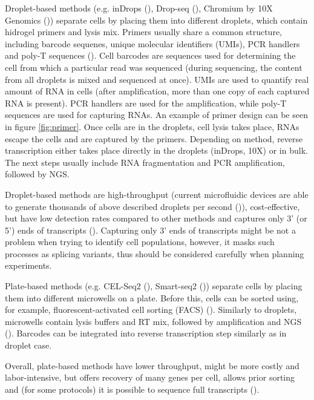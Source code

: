 Droplet-based methods (e.g. inDrops (\cite{Klein2015}), Drop-seq (\cite{Macosko2015}),
Chromium by 10X Genomics (\cite{Zheng2017}))
separate cells by placing them into different droplets, which contain hidrogel primers and lysis mix.
Primers usually share a common structure, including barcode sequenes, unique molecular identifiers (UMIs),
PCR handlers and poly-T sequences (\cite{Zhang2019}).
Cell barcodes are sequences used for determining the cell from which a particular read was sequenced
(during sequencing, the content from all droplets is mixed and sequenced at once).
UMIs are used to quantify real amount of RNA in cells
(after amplification, more than one copy of each captured RNA is present).
PCR handlers are used for the amplification, while poly-T sequences are used for capturing RNAs.
An example of primer design can be seen in figure \ref{fig:primer}.
Once cells are in the droplets, cell lysis takes place, RNAs escape the cells and are captured by the primers.
Depending on method,
reverse transcription either takes place directly in the droplets (inDrops, 10X) or in bulk.
The next steps usually include RNA fragmentation and PCR amplification, followed by NGS.

Droplet-based methods are high-throughput
(current microfluidic devices are able to generate thousands of above described droplets per second (\cite{Prakadan2017})),
cost-effective, but have low detection rates compared to other methods and
captures only 3' (or 5') ends of transcripts (\cite{Heumos2023}).
Capturing only 3' ends of transcripts might be not a problem when trying to identify cell populations,
however, it masks such processes as splicing variants, thus should be considered carefully when planning experiments.

Plate-based methods (e.g. CEL-Seq2 (\cite{Hashimshony2016}), Smart-seq2 (\cite{Picelli2013}))
separate cells by placing them into different microwells on a plate.
Before this, cells can be sorted using, for example, fluorescent-activated cell sorting (FACS) (\cite{Heumos2023}).
Similarly to droplets, microwells contain lysis buffers and RT mix,
followed by amplification and NGS (\cite{Hashimshony2016}).
Barcodes can be integrated into reverse transcription step similarly as in droplet case.

Overall, plate-based methods have lower throughput, might be more costly and labor-intensive,
but offers recovery of many genes per cell, allows prior sorting and
(for some protocols) it is possible to sequence full transcripts (\cite{Heumos2023}).

